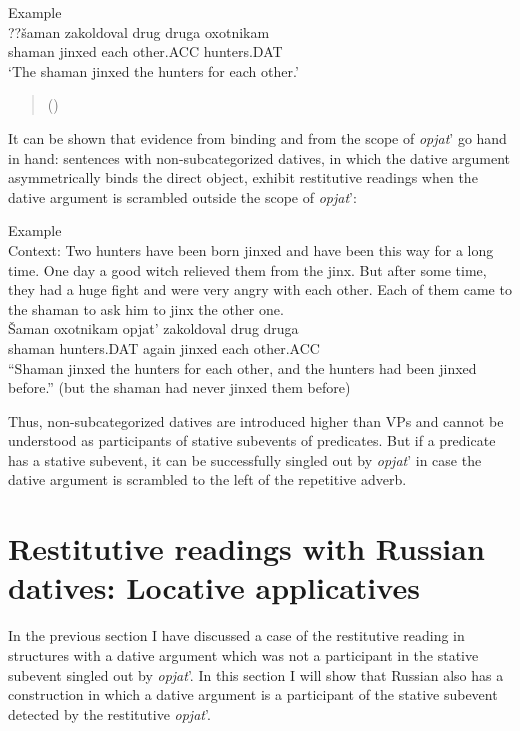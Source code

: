 \documentclass[output=paper,modfonts,nonflat,
 hidelinks
]{langsci/langscibook}
\begin{document}
\ex Example\\
\gll ??šaman zakoldoval drug druga oxotnikam\\
     shaman jinxed each other.ACC hunters.DAT\\
  ‘The shaman jinxed the hunters for each other.’
\z
\z
{}
\begin{quote}
(\citealt{BonehNash2017})
\end{quote}


It can be shown that evidence from binding and from the scope of \textit{opjat}’ go hand in hand: sentences with non-subcategorized datives, in which the dative argument asymmetrically binds the direct object, exhibit restitutive readings when the dative argument is scrambled outside the scope of \textit{opjat}’:


 \ea\label{ex:bondarenko:}
{Example}\\

Context: Two hunters have been born jinxed and have been this way for a long time. One day a good witch relieved them from the jinx. But after some time, they had a huge fight and were very angry with each other. Each of them came to the shaman to ask him to jinx the other one.\\

\gll Šaman oxotnikam opjat’ zakoldoval drug druga\\
     shaman hunters.DAT again jinxed each other.ACC\\
\glt “Shaman jinxed the hunters for each other, and the hunters had been jinxed before.” (but the shaman had never jinxed them before)
\z


Thus, non-subcategorized datives are introduced higher than VPs and cannot be understood as participants of stative subevents of predicates. But if a predicate has a stative subevent, it can be successfully singled out by \textit{opjat}’ in case the dative argument is scrambled to the left of the repetitive adverb.


\section{Restitutive readings with Russian datives: Locative applicatives}

In the previous section I have discussed a case of the restitutive reading in structures with a dative argument which was not a participant in the stative subevent singled out by \textit{opjat}’. In this section I will show that Russian also has a construction in which a dative argument is a participant of the stative subevent detected by the restitutive \textit{opjat}’.
\end{document}
